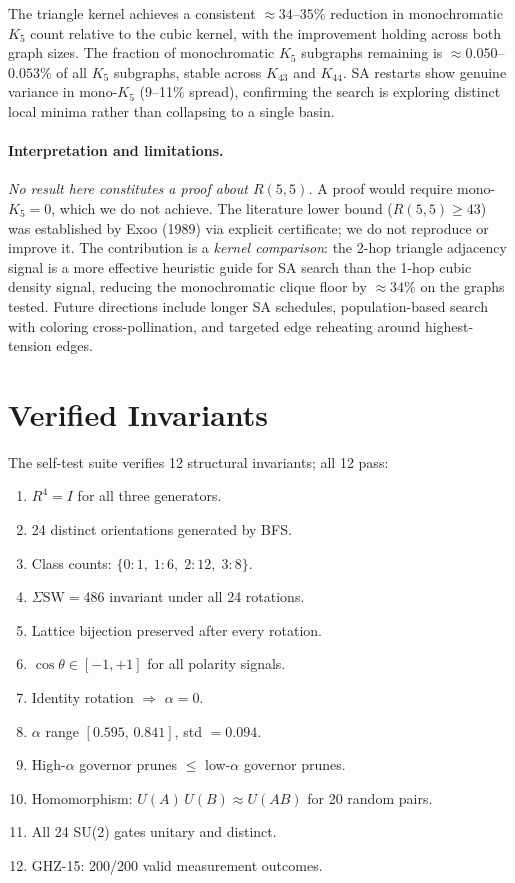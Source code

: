 \documentclass{article}
\begin{document}
The triangle kernel achieves a consistent $\approx34$--$35\%$ reduction in monochromatic $K_5$
count relative to the cubic kernel, with the improvement holding across both graph sizes.
The fraction of monochromatic $K_5$ subgraphs remaining is $\approx0.050$--$0.053\%$
of all $K_5$ subgraphs, stable across $K_{43}$ and $K_{44}$.
SA restarts show genuine variance in mono-$K_5$ (9--11\% spread), confirming the search
is exploring distinct local minima rather than collapsing to a single basin.

\paragraph{Interpretation and limitations.}
\emph{No result here constitutes a proof about $R(5,5)$.}
A proof would require mono-$K_5=0$, which we do not achieve.
The literature lower bound ($R(5,5)\ge43$) was established by Exoo (1989) via explicit
certificate; we do not reproduce or improve it.
The contribution is a \emph{kernel comparison}: the 2-hop triangle adjacency signal is a
more effective heuristic guide for SA search than the 1-hop cubic density signal,
reducing the monochromatic clique floor by $\approx34\%$ on the graphs tested.
Future directions include longer SA schedules, population-based search with coloring
cross-pollination, and targeted edge reheating around highest-tension edges.

\section{Verified Invariants}

The self-test suite verifies 12 structural invariants; all 12 pass:

\begin{enumerate}[nosep,leftmargin=*]
  \item $R^{4}=I$ for all three generators.
  \item 24 distinct orientations generated by BFS.
  \item Class counts: $\{0\!:\!1,\;1\!:\!6,\;2\!:\!12,\;3\!:\!8\}$.
  \item $\Sigma\mathrm{SW}=486$ invariant under all 24 rotations.
  \item Lattice bijection preserved after every rotation.
  \item $\cos\theta\in[-1,+1]$ for all polarity signals.
  \item Identity rotation $\Rightarrow$ $\alpha=0$.
  \item $\alpha$ range $[0.595,\,0.841]$, std $=0.094$.
  \item High-$\alpha$ governor prunes $\leq$ low-$\alpha$ governor prunes.
  \item Homomorphism: $U(A)\,U(B)\approx U(AB)$ for 20 random pairs.
  \item All 24 SU(2) gates unitary and distinct.
  \item GHZ-15: 200/200 valid measurement outcomes.
\end{enumerate}
\end{document}

